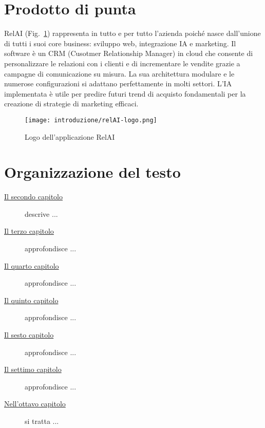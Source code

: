 \newpage

\section{Prodotto di punta}
RelAI (Fig.~\ref{fig:logo-RelAI}) rappresenta in tutto e per tutto l'azienda poiché nasce dall'unione di tutti i suoi core business: sviluppo web, integrazione IA e marketing.
Il software è un CRM (Cusotmer Relationship Manager) in cloud che consente di personalizzare le relazioni con i clienti e di incrementare le vendite grazie a campagne di comunicazione su misura.
La sua architettura modulare e le numerose configurazioni si adattano perfettamente in molti settori. L'IA implementata è utile per predire futuri trend di acquisto fondamentali per la creazione di strategie di marketing efficaci. 


\begin{figure}[!h] 
  \centering 
  \texttt{[image: introduzione/relAI-logo.png]} 
  \caption{Logo dell'applicazione RelAI}
  \label{fig:logo-RelAI}
\end{figure}

\section{Organizzazione del testo}

\begin{description}
    \item[{\hyperref[cap:processi-metodologie]{Il secondo capitolo}}] descrive ...
    
    \item[{\hyperref[cap:descrizione-stage]{Il terzo capitolo}}] approfondisce ...
    
    \item[{\hyperref[cap:analisi-requisiti]{Il quarto capitolo}}] approfondisce ...
    
    \item[{\hyperref[cap:strumenti-tecnologie]{Il quinto capitolo}}] approfondisce ...
    
    \item[{\hyperref[cap:teoria]{Il sesto capitolo}}] approfondisce ...
    
    \item[{\hyperref[cap:progettazione]{Il settimo capitolo}}] approfondisce ...
    
    \item[{\hyperref[cap:conclusioni]{Nell'ottavo capitolo}}] si tratta ...
\end{description}

